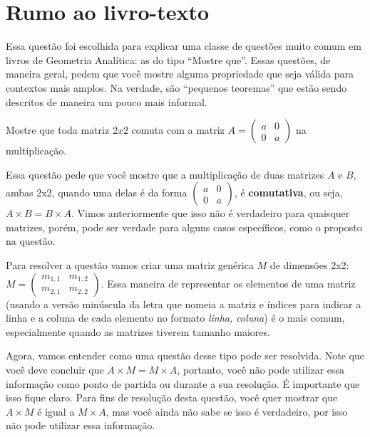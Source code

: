 \documentclass[main_estudante.tex]{subfiles}
\begin{document}
\section{Rumo ao livro-texto}

Essa questão foi escolhida para explicar uma classe de questões muito comum em livros de Geometria Analítica: as do tipo ``Mostre que''. Essas questões, de maneira geral, pedem que você mostre alguma propriedade que seja válida para contextos mais amplos. Na verdade, são ``pequenos teoremas'' que estão sendo descritos de maneira um pouco mais informal.

\begin{resolvida}
Mostre que toda matriz $2x2$ comuta com a matriz $A=\begin{pmatrix}a & 0 \\ 0 & a\end{pmatrix}$ na multiplicação.
\end{resolvida}


Essa questão pede que você mostre que a multiplicação de duas matrizes $A$ e $B$, ambas 2x2, quando uma delas é da forma $\begin{pmatrix}a & 0 \\ 0 & a\end{pmatrix}$, é \textbf{comutativa}, ou seja, $A \times B = B \times A$. Vimos anteriormente que isso não é verdadeiro para quaisquer matrizes, porém, pode ser verdade para alguns casos específicos, como o proposto na questão.

Para resolver a questão vamos criar uma matriz genérica $M$ de dimensões 2x2: $M = \begin{pmatrix}m_{1,1} & m_{1,2} \\ m_{2,1} & m_{2,2}\end{pmatrix}$. Essa maneira de representar os elementos de uma matriz (usando a versão minúscula da letra que nomeia a matriz e índices para indicar a linha e a coluna de cada elemento no formato {\it linha, coluna}) é o mais comum, especialmente quando as matrizes tiverem tamanho maiores.

Agora, vamos entender como uma questão desse tipo pode ser resolvida. Note que você deve concluir que $A \times M = M \times A$, portanto, você não pode utilizar essa informação como ponto de partida ou durante a sua resolução. É importante que isso fique claro. Para fins de resolução desta questão, você quer mostrar que $A \times M$ é igual a $M \times A$, mas você ainda não sabe se isso é verdadeiro, por isso não pode utilizar essa informação.
\end{document}
